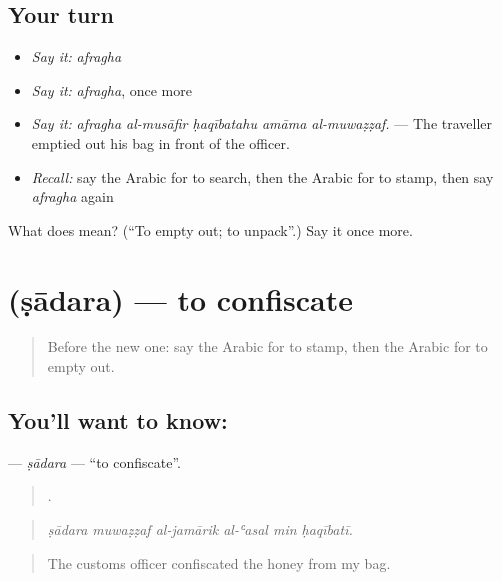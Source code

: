 \subsection*{Your turn}
\begin{itemize}
\raggedright
  \item \emph{Say it:} \emph{afragha}
  \item \emph{Say it:} \emph{afragha}, once more
  \item \emph{Say it:} \emph{afragha al-musāfir ḥaqībatahu amāma al-muwaẓẓaf.} — The traveller emptied out his bag in front of the officer.
  \item \emph{Recall:} say the Arabic for to search, then the Arabic for to stamp, then say \emph{afragha} again
\end{itemize}

\begin{tcolorbox}[breakable,colback=teal!4,colframe=teal!35!black,title={Before you move on}]
What does  mean? (\textquotedblleft{}To empty out; to unpack\textquotedblright{}.) Say it once more.
\end{tcolorbox}
\section[\texorpdfstring{\ar{صادر} (ṣādara)}{صادر (ṣādara)}]{ (ṣādara) — to confiscate}

\label{lesson:AR-C426-sadara}



\begin{quote}
Before the new one: say the Arabic for to stamp, then the Arabic for to empty out.
\end{quote}

\subsection*{You'll want to know: }
\textbf{} — \emph{ṣādara} — \textquotedblleft{}to confiscate\textquotedblright{}.

\begin{quote}
     .
\end{quote}

\begin{quote}
\emph{ṣādara muwaẓẓaf al-jamārik al-ʿasal min ḥaqībatī.}
\end{quote}

\begin{quote}
The customs officer confiscated the honey from my bag.
\end{quote}

